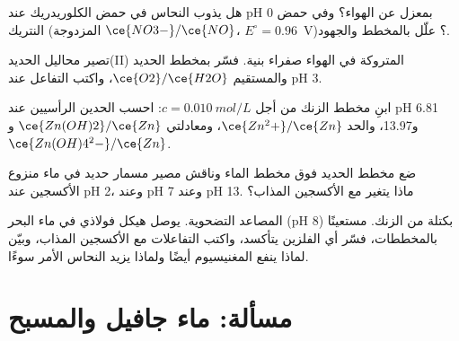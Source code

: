 \begin{exercise}[$\star\star$]\label{exo:b1:e-ph-diagrams:8}
هل يذوب النحاس في حمض الكلوريدريك عند pH 0 بمعزل عن الهواء؟ وفي حمض
النتريك (المزدوجة $\ce{NO3-}/\ce{NO}$، $E^\circ = 0.96$~V)؟ علّل بالمخطط
والجهود.
\end{exercise}

\begin{exercise}[$\star\star$]\label{exo:b1:e-ph-diagrams:9}
تصير محاليل الحديد(II) المتروكة في الهواء صفراء بنية. فسّر بمخطط
الحديد والمستقيم $\ce{O2}/\ce{H2O}$، واكتب التفاعل عند pH 3.
\end{exercise}

\begin{exercise}[$\star\star\star$]\label{exo:b1:e-ph-diagrams:10}
ابنِ مخطط الزنك من أجل $c = \qty{0.010}{mol/L}$: احسب
الحدين الرأسيين عند pH 6.81 و13.97، والحد $\ce{Zn^2+}/\ce{Zn}$،
ومعادلتي $\ce{Zn(OH)2}/\ce{Zn}$ و$\ce{Zn(OH)4^2-}/\ce{Zn}$.
\end{exercise}

\begin{exercise}[$\star\star\star$]\label{exo:b1:e-ph-diagrams:11}
ضع مخطط الحديد فوق مخطط الماء وناقش مصير مسمار
حديد في ماء منزوع الأكسجين عند pH 2، وعند pH 7 وعند pH 13. ماذا
يتغير مع الأكسجين المذاب؟
\end{exercise}

\begin{exercise}[$\star\star\star$]\label{exo:b1:e-ph-diagrams:12}
المصاعد التضحوية. يوصل هيكل فولاذي في ماء البحر (pH 8) بكتلة
من الزنك. مستعينًا بالمخططات، فسّر أي الفلزين يتأكسد، واكتب
التفاعلات مع الأكسجين المذاب، وبيّن لماذا ينفع المغنيسيوم أيضًا
ولماذا يزيد النحاس الأمر سوءًا.
\end{exercise}

\section{مسألة: ماء جافيل والمسبح}

